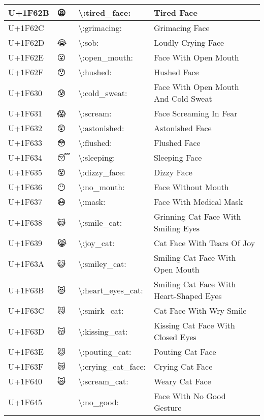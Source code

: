 \begin{table}[h]
\begin{tabulary}{\linewidth}{|L|L|L|L|}
\hline
U+1F62B & 😫 & {\textbackslash}:tired\_face: & Tired Face \\
\hline
U+1F62C & 😬 & {\textbackslash}:grimacing: & Grimacing Face \\
\hline
U+1F62D & 😭 & {\textbackslash}:sob: & Loudly Crying Face \\
\hline
U+1F62E & 😮 & {\textbackslash}:open\_mouth: & Face With Open Mouth \\
\hline
U+1F62F & 😯 & {\textbackslash}:hushed: & Hushed Face \\
\hline
U+1F630 & 😰 & {\textbackslash}:cold\_sweat: & Face With Open Mouth And Cold Sweat \\
\hline
U+1F631 & 😱 & {\textbackslash}:scream: & Face Screaming In Fear \\
\hline
U+1F632 & 😲 & {\textbackslash}:astonished: & Astonished Face \\
\hline
U+1F633 & 😳 & {\textbackslash}:flushed: & Flushed Face \\
\hline
U+1F634 & 😴 & {\textbackslash}:sleeping: & Sleeping Face \\
\hline
U+1F635 & 😵 & {\textbackslash}:dizzy\_face: & Dizzy Face \\
\hline
U+1F636 & 😶 & {\textbackslash}:no\_mouth: & Face Without Mouth \\
\hline
U+1F637 & 😷 & {\textbackslash}:mask: & Face With Medical Mask \\
\hline
U+1F638 & 😸 & {\textbackslash}:smile\_cat: & Grinning Cat Face With Smiling Eyes \\
\hline
U+1F639 & 😹 & {\textbackslash}:joy\_cat: & Cat Face With Tears Of Joy \\
\hline
U+1F63A & 😺 & {\textbackslash}:smiley\_cat: & Smiling Cat Face With Open Mouth \\
\hline
U+1F63B & 😻 & {\textbackslash}:heart\_eyes\_cat: & Smiling Cat Face With Heart-Shaped Eyes \\
\hline
U+1F63C & 😼 & {\textbackslash}:smirk\_cat: & Cat Face With Wry Smile \\
\hline
U+1F63D & 😽 & {\textbackslash}:kissing\_cat: & Kissing Cat Face With Closed Eyes \\
\hline
U+1F63E & 😾 & {\textbackslash}:pouting\_cat: & Pouting Cat Face \\
\hline
U+1F63F & 😿 & {\textbackslash}:crying\_cat\_face: & Crying Cat Face \\
\hline
U+1F640 & 🙀 & {\textbackslash}:scream\_cat: & Weary Cat Face \\
\hline
U+1F645 & 🙅 & {\textbackslash}:no\_good: & Face With No Good Gesture \\

\end{tabulary}
\end{table}
